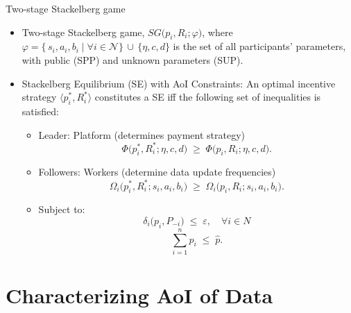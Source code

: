 \documentclass[aspectratio=169,xcolor=dvipsnames]{beamer}
\begin{document}
\begin{frame}[fragile]{Two-stage Stackelberg game}
    \footnotesize %
    \begin{itemize}[<+-| alert@+>]
        \setlength{\itemsep}{0.5cm} %
        
        \item Two-stage Stackelberg game, \(  SG\bigl(p_i, R_i; \varphi\bigr)\), where $\varphi = \{\,s_i,a_i,b_i \mid \forall i \in \mathcal{N}\}\,\cup\,\{\eta,c,d\}$ is the set of all participants' parameters, with public (SPP) and unknown parameters (SUP).\\ 

        \item Stackelberg Equilibrium (SE) with AoI Constraints: An optimal incentive strategy $\langle p_i^*, R_i^* \rangle$ constitutes a SE iff the following set of inequalities is satisfied:

            \begin{itemize}%
                \setlength{\itemsep}{0.2cm} %
                \item Leader: Platform (determines payment strategy) 
                \[
                \Phi\bigl(p_i^*, R_i^*; \eta, c, d\bigr)
                \;\ge\;
                \Phi\bigl(p_i, R_i; \eta, c, d\bigr).
                \]
                
                \item Followers: Workers (determine data update frequencies)
                \[
                \Omega_i\bigl(p_i^*, R_i^*; s_i, a_i, b_i\bigr) 
                \;\ge\;
                \Omega_i\bigl(p_i, R_i; s_i, a_i, b_i\bigr).
                \]
            
                \item Subject to: \[
                \delta_i\bigl(p_i, P_{-i}\bigr) \;\le\; \varepsilon,
                \quad \forall i \in N
                \]
                \[
                \sum_{i=1}^{n} p_i \;\le\; \hat{p}.
                \]
    
            \end{itemize}
        
    \end{itemize}
\end{frame}

\section{Characterizing AoI of Data}
\end{document}
